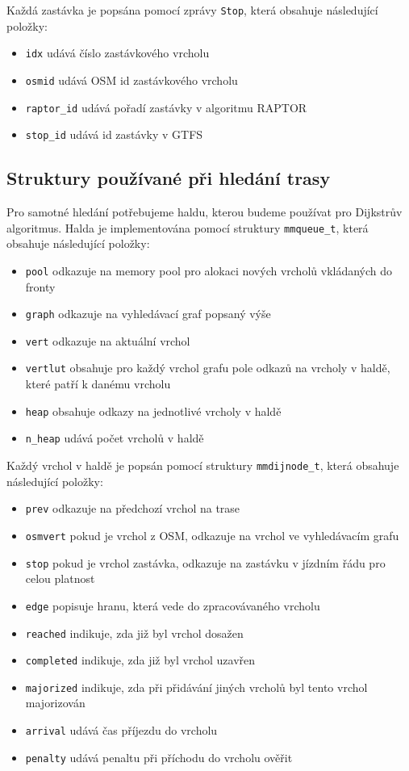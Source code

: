 Každá zastávka je popsána pomocí zprávy {\tt Stop}, která obsahuje následující
položky:
\begin{itemize}
	\item {\tt idx} udává číslo zastávkového vrcholu
	\item {\tt osmid} udává OSM id zastávkového vrcholu 
	\item {\tt raptor\_id} udává pořadí zastávky v algoritmu RAPTOR
	\item {\tt stop\_id} udává id zastávky v GTFS
\end{itemize} 

\subsection{Struktury používané při hledání trasy}
Pro samotné hledání potřebujeme haldu, kterou budeme používat pro Dijkstrův
algoritmus. Halda je implementována pomocí struktury {\tt mmqueue\_t}, která
obsahuje následující položky:
\begin{itemize}
	\item {\tt pool} odkazuje na memory pool pro alokaci nových vrcholů
	vkládaných do fronty 
	\item {\tt graph} odkazuje na vyhledávací graf popsaný výše
	\item {\tt vert} odkazuje na aktuální vrchol 
	\item {\tt vertlut} obsahuje pro každý vrchol grafu pole odkazů na
	vrcholy v haldě, které patří k danému vrcholu
	\item {\tt heap} obsahuje odkazy na jednotlivé vrcholy v haldě
	\item {\tt n\_heap} udává počet vrcholů v haldě
\end{itemize}
Každý vrchol v haldě je popsán pomocí struktury {\tt mmdijnode\_t}, která
obsahuje následující položky:
\begin{itemize}
	\item {\tt prev} odkazuje na předchozí vrchol na trase
	\item {\tt osmvert} pokud je vrchol z OSM, odkazuje na vrchol ve
	vyhledávacím grafu 
	\item {\tt stop} pokud je vrchol zastávka, odkazuje na zastávku v
	jízdním řádu pro celou platnost
	\item {\tt edge} popisuje hranu, která vede do zpracovávaného vrcholu 
	\item {\tt reached} indikuje, zda již byl vrchol dosažen
	\item {\tt completed} indikuje, zda již byl vrchol uzavřen
	\item {\tt majorized} indikuje, zda při přidávání jiných vrcholů byl
	tento vrchol majorizován
	\item {\tt arrival} udává čas příjezdu do vrcholu
	\item {\tt penalty} udává penaltu při příchodu do vrcholu \TODO ověřit
\end{itemize}
